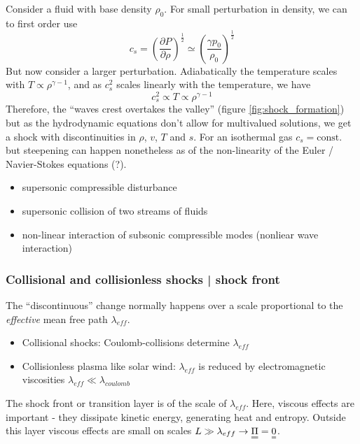 Consider a fluid with base density $\rho_0$. For small perturbation in density, we can to first order
use
\begin{equation}
    c_s = \left( \frac{\partial P}{\partial \rho} \right)^{\frac{1}{2}} \simeq \left(\frac{\gamma p_0}{\rho_0}\right)^{\frac{1}{2}}
\end{equation}
But now consider a larger perturbation. Adiabatically the temperature scales with $T \propto \rho^{\gamma - 1}$, and as $c_s^2$ scales
linearly with the temperature, we have
\begin{equation}
    c_s^2 \propto T \propto \rho^{\gamma - 1} 
\end{equation}
Therefore, the “waves crest overtakes the valley” (figure \ref{fig:shock_formation}) but as the hydrodynamic equations don't allow for multivalued solutions, we get a shock
with discontinuities in $\rho$, $v$, $T$ and $s$. For an isothermal gas $c_s = \text{const.}$ but steepening can happen
nonetheless as of the non-linearity of the Euler / Navier-Stokes equations (?).

\begin{itemize}
    \item supersonic compressible disturbance
    \item supersonic collision of two streams of fluids
    \item non-linear interaction of subsonic compressible modes (nonliear wave interaction)
\end{itemize}

\subsubsection{Collisional and collisionless shocks | shock front}
The \enquote{discontinuous} change normally happens over a scale proportional to the \textit{effective} mean free path $\lambda_{eff}$.
\begin{itemize}
    \item Collisional shocks: Coulomb-collisions determine $\lambda_{eff}$
    \item Collisionless plasma like solar wind: $\lambda_{eff}$ is reduced by electromagnetic viscosities $\lambda_{eff} \ll \lambda_{coulomb}$
\end{itemize}

The shock front or transition layer is of the scale of $\lambda_{eff}$. Here, viscous effects are important - they dissipate kinetic energy, generating heat and entropy. Outside this layer viscous effects are small on scales $L \gg \lambda_{eff} \rightarrow \mat{\Pi} = \mat{0}$.

